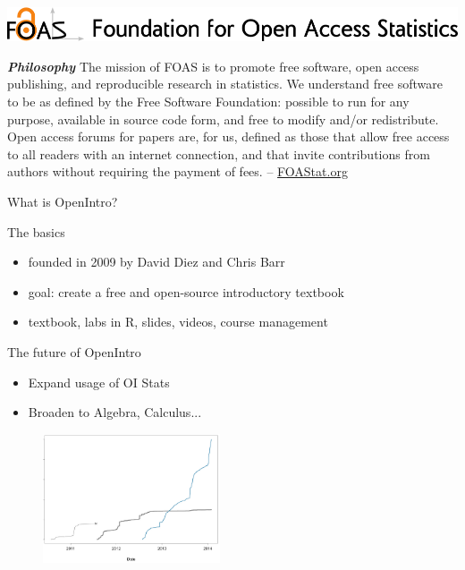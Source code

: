
\begin{frame}

\includegraphics[width=\linewidth]{FOASLogo.png}


{\footnotesize {\bf \em Philosophy} The mission of FOAS is to promote free software, open access publishing, and reproducible research in statistics. We understand free software to be as defined by the Free Software Foundation: possible to run for any purpose, available in source code form, and free to modify and/or redistribute. Open access forums for papers are, for us, defined as those that allow free access to all readers with an internet connection, and that invite contributions from authors without requiring the payment of fees. -- \href{http://www.foastat.org}{FOAStat.org}

}

\end{frame}




\begin{frame}{What is OpenIntro?}

\begin{block}{The basics}
\begin{itemize}
        \item founded in 2009 by David Diez and Chris Barr
        \item goal: create a free and open-source introductory textbook 
        \item textbook, labs in R, slides, videos, course management
\end{itemize}
\end{block}

\begin{minipage}{0.5\linewidth}
\begin{block}{The future of OpenIntro}
\begin{itemize}
\item Expand usage of OI Stats
\item Broaden to Algebra, Calculus...
\end{itemize}
\end{block}
\end{minipage}
\begin{minipage}{0.45\linewidth}
\begin{figure}
   \includegraphics[height = 1.5in]{oiUsage.png}
\end{figure}
\end{minipage}

\end{frame}

